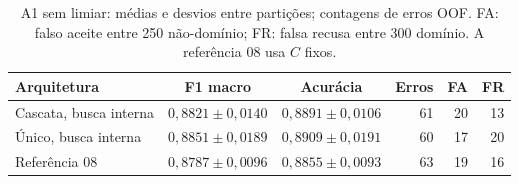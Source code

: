 \begin{table}[!htb]
\centering\small
\caption{A1 sem limiar: médias e desvios entre partições; contagens de erros OOF. FA: falso aceite entre 250 não-domínio; FR: falsa recusa entre 300 domínio. A referência 08 usa \(C\) fixos.}
\label{tab:a1}
\begin{tabular}{lccrrr}
\toprule Arquitetura & F1 macro & Acurácia & Erros & FA & FR\\ \midrule
Cascata, busca interna & \(0{,}8821\pm0{,}0140\) & \(0{,}8891\pm0{,}0106\) & 61 & 20 & 13\\
Único, busca interna & \(0{,}8851\pm0{,}0189\) & \(0{,}8909\pm0{,}0191\) & 60 & 17 & 20\\
Referência 08 & \(0{,}8787\pm0{,}0096\) & \(0{,}8855\pm0{,}0093\) & 63 & 19 & 16\\
\bottomrule\end{tabular}
\end{table}
